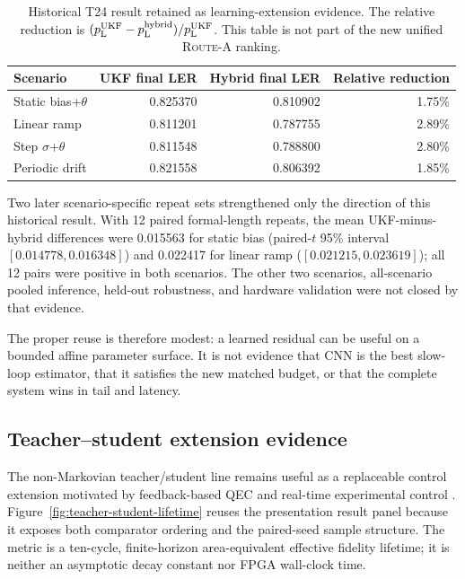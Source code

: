 \documentclass[11pt]{article}
\newcommand{\RouteA}{\textsc{Route-A}}
\newcommand{\pL}{p_{\mathrm L}}
\begin{document}
\begin{table}[htbp]
\centering
\small
\caption{Historical T24 result retained as learning-extension evidence.  The
relative reduction is $(\pL^{\rm UKF}-\pL^{\rm hybrid})/\pL^{\rm UKF}$.
This table is not part of the new unified \RouteA{} ranking.}
\label{tab:legacy-t24}
\begin{tabular}{@{}l r r r@{}}
\toprule
Scenario & UKF final LER & Hybrid final LER & Relative reduction \\
\midrule
Static bias+$\theta$ & 0.825370 & 0.810902 & 1.75\% \\
Linear ramp & 0.811201 & 0.787755 & 2.89\% \\
Step $\sigma$+$\theta$ & 0.811548 & 0.788800 & 2.80\% \\
Periodic drift & 0.821558 & 0.806392 & 1.85\% \\
\bottomrule
\end{tabular}
\end{table}

Two later scenario-specific repeat sets strengthened only the direction of this
historical result.  With 12 paired formal-length repeats, the mean UKF-minus-
hybrid differences were 0.015563 for static bias
(paired-$t$ 95\% interval $[0.014778,0.016348]$) and 0.022417 for linear ramp
($[0.021215,0.023619]$); all 12 pairs were positive in both scenarios.  The
other two scenarios, all-scenario pooled inference, held-out robustness, and
hardware validation were not closed by that evidence.

The proper reuse is therefore modest: a learned residual can be useful on a
bounded affine parameter surface.  It is not evidence that CNN is the best
slow-loop estimator, that it satisfies the new matched budget, or that the
complete system wins in tail and latency.

\subsection{Teacher--student extension evidence}

The non-Markovian teacher/student line remains useful as a replaceable control
extension motivated by feedback-based QEC and real-time experimental control
\cite{puviani2025,sivak2023}.  Figure~\ref{fig:teacher-student-lifetime} reuses
the presentation result panel because it exposes both comparator ordering and
the paired-seed sample structure.  The metric is a ten-cycle, finite-horizon
area-equivalent effective fidelity lifetime; it is neither an asymptotic decay
constant nor FPGA wall-clock time.
\end{document}
